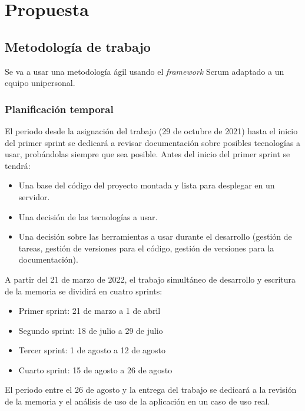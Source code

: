 \chapter{Propuesta}


\section{Metodología de trabajo}

Se va a usar una metodología ágil usando el \textit{framework} Scrum adaptado a un equipo unipersonal.


\subsection{Planificación temporal}

El periodo desde la asignación del trabajo (29 de octubre de 2021) hasta el inicio del primer sprint se dedicará a revisar documentación sobre posibles tecnologías a usar, probándolas siempre que sea posible. Antes del inicio del primer sprint se tendrá:

\begin{itemize}
    \item Una base del código del proyecto montada y lista para desplegar en un servidor.
    \item Una decisión de las tecnologías a usar.
    \item Una decisión sobre las herramientas a usar durante el desarrollo (gestión de tareas, gestión de versiones para el código, gestión de versiones para la documentación).
\end{itemize}

A partir del 21 de marzo de 2022, el trabajo simultáneo de desarrollo y escritura de la memoria se dividirá en cuatro sprints:
\begin{itemize}
    \item Primer sprint: 21 de marzo a 1 de abril
    \item Segundo sprint: 18 de julio a 29 de julio
    \item Tercer sprint: 1 de agosto a 12 de agosto
    \item Cuarto sprint: 15 de agosto a 26 de agosto
\end{itemize}

El periodo entre el 26 de agosto y la entrega del trabajo se dedicará a la revisión de la memoria y el análisis de uso de la aplicación en un caso de uso real.


